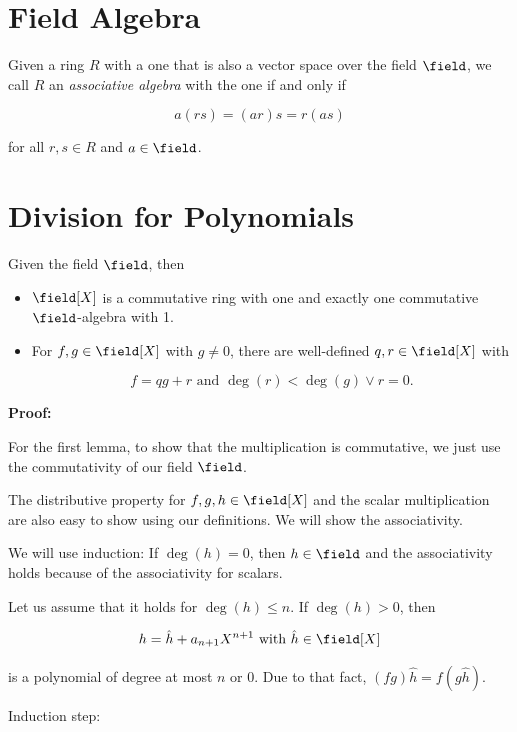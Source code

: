 \section{Field Algebra}

Given a ring \(R\) with a one that is also a vector space over the field \(\field\), we call 
\(R\) an \emph{associative algebra} with the one if and only if 

\[
    a(rs) = (ar)s = r(as)
\]

for all \(r,s \in R\) and \(a \in \field\).

\section{Division for Polynomials}

Given the field \(\field\), then 

\begin{itemize}

    \item  \(\field[X]\) is a commutative ring with one and exactly one commutative \(\field\)-algebra with 1.

    \item For \(f, g \in \field[X]\) with \(g \ne 0\), there are well-defined \(q,r \in \field[X]\) with 
    
    \[
        f = qg + r \text{ and } \deg(r) < \deg(g) \lor r = 0.
    \]
    
\end{itemize}

\textbf{Proof:}

For the first lemma, to show that the multiplication is commutative, we just 
use the commutativity of our field \(\field\). 

The distributive property for \(f,g,h \in \field [X]\) and the scalar multiplication 
are also easy to show using our definitions. We will show the associativity. 

We will use induction: If \(\deg(h) = 0\), then \(h \in \field\) and the associativity holds because of the 
associativity for scalars. 

Let us assume that it holds for \(\deg(h) \le n\). If \(\deg(h) > 0\), then

\[
    h = \hat{h} + a_{n + 1}X^{n + 1} \text{ with } \hat{h} \in \field [X]
\]

is a polynomial of degree at most \(n\) or 0. Due to that fact, \((fg)\hat{h} = f(g\hat{h})\). 

Induction step:


